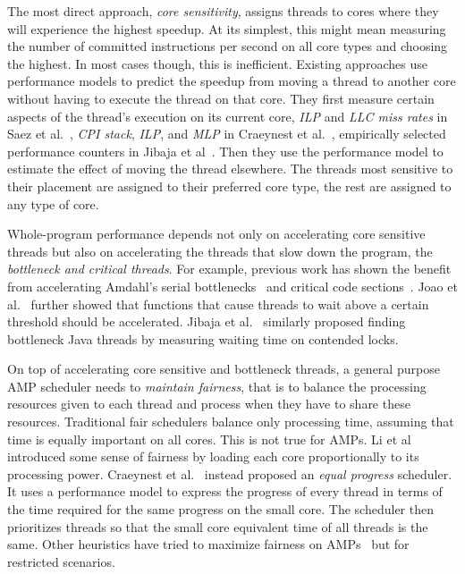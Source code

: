 The most direct approach, \emph{core sensitivity}, assigns threads to cores where they will experience the highest speedup. At its simplest, this might mean measuring the number of committed instructions per second on all core types and choosing the highest. In most cases though, this is inefficient. Existing approaches use performance models to predict the speedup from moving a thread to another core without having to execute the thread on that core. They first measure certain aspects of the thread's execution on its current core, \emph{ILP} and \emph{LLC miss rates} in Saez et al.~\cite{saez2012leveraging}, \emph{CPI stack}, \emph{ILP}, and \emph{MLP} in Craeynest et al.~\cite{van2012scheduling}, empirically selected performance counters in Jibaja et al~\cite{jibaja2016portable}. Then they use the performance model to estimate the effect of moving the thread elsewhere. The threads most sensitive to their placement are assigned to their preferred core type, the rest are assigned to any type of core.

Whole-program performance depends not only on accelerating core sensitive threads but also on accelerating the threads that slow down the program, the \emph{bottleneck and critical threads}. For example, previous work has shown the benefit from accelerating Amdahl's serial bottlenecks~\cite{Kumar:2005:HCM:1100859.1100890} and critical code sections~\cite{suleman2009accelerating}. Joao et al.~\cite{joao2012bottleneck,joao2013utility} further showed that functions that cause threads to wait above a certain threshold should be accelerated. Jibaja et al.~\cite{jibaja2016portable} similarly proposed finding bottleneck Java threads by measuring waiting time on contended locks.

On top of accelerating core sensitive and bottleneck threads, a general purpose AMP scheduler needs to \emph{maintain fairness}, that is to balance the processing resources given to each thread and process when they have to share these resources. Traditional fair schedulers balance only processing time, assuming that time is equally important on all cores. This is not true for AMPs. Li et al~\cite{li2007efficient} introduced some sense of fairness by loading each core proportionally to its processing power. Craeynest et al.~\cite{van2013fairness} instead proposed an \emph{equal progress} scheduler. It uses a performance model to express the progress of every thread in terms of the time required for the same progress on the small core. The scheduler then prioritizes threads so that the small core equivalent time of all threads is the same. Other heuristics have tried to maximize fairness on AMPs~\cite{zahedi2018amdahl,wang2016rebudget,kim2018exploring} but for restricted scenarios.

